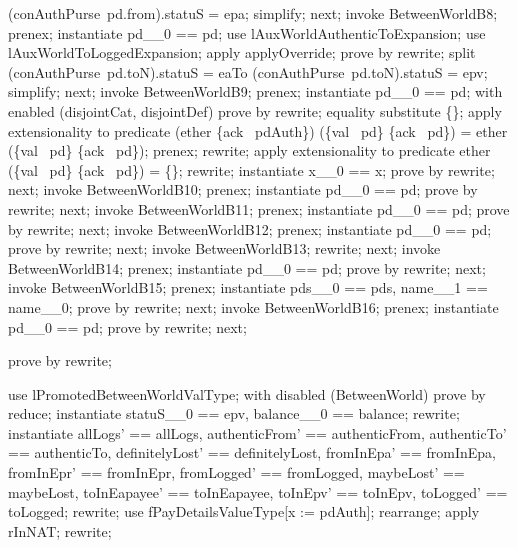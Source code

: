 \begin{LPScript}
\begin{zproof}[lPromotedBetweenWorldValType]
          \lor (conAuthPurse~pd.from).statuS = epa;
        simplify;
    next;
        invoke BetweenWorldB8;
        prenex;
        instantiate pd\_\_0 == pd;
        use lAuxWorldAuthenticToExpansion;
        use lAuxWorldToLoggedExpansion;
        apply applyOverride;
        prove by rewrite;
        split (conAuthPurse~pd.toN).statuS = eaTo
            \lor (conAuthPurse~pd.toN).statuS = epv;
        simplify;
    next;
        invoke BetweenWorldB9;
        prenex;
        instantiate pd\_\_0 == pd;
        with enabled (disjointCat, disjointDef) prove by rewrite;
        equality substitute \{\};
        apply extensionality to predicate
            (ether \cup \{ack~ pdAuth\}) \cap (\{val~ pd\} \cup \{ack~ pd\})
             = ether \cap (\{val~ pd\} \cup \{ack~ pd\});
        prenex;
        rewrite;
        apply extensionality to predicate
            ether \cap (\{val~ pd\} \cup \{ack~ pd\}) = \{\};
        rewrite;
        instantiate x\_\_0 == x;
        prove by rewrite;
    next;
        invoke BetweenWorldB10;
        prenex;
        instantiate pd\_\_0 == pd;
        prove by rewrite;
    next;
        invoke BetweenWorldB11;
        prenex;
        instantiate pd\_\_0 == pd;
        prove by rewrite;
    next;
        invoke BetweenWorldB12;
        prenex;
        instantiate pd\_\_0 == pd;
        prove by rewrite;
    next;
        invoke BetweenWorldB13;
        rewrite;
    next;
        invoke BetweenWorldB14;
        prenex;
        instantiate pd\_\_0 == pd;
        prove by rewrite;
    next;
        invoke BetweenWorldB15;
        prenex;
        instantiate pds\_\_0 == pds, name\_\_1 == name\_\_0;
        prove by rewrite;
    next;
        invoke BetweenWorldB16;
        prenex;
        instantiate pd\_\_0 == pd;
        prove by rewrite;
    next;
\end{zproof}\end{LPScript}

\begin{LDCheck}\begin{zproof}
    prove by rewrite;
\end{zproof}\end{LDCheck}

\begin{LPScript}\begin{zproof}[tBetwValOkayPRE]
    use lPromotedBetweenWorldValType;
    with disabled (BetweenWorld) prove by reduce;
    instantiate statuS\_\_0 == epv, balance\_\_0 == balance;
    rewrite;
    instantiate allLogs' == allLogs, authenticFrom' == authenticFrom,
        authenticTo' == authenticTo, definitelyLost' == definitelyLost,
        fromInEpa' == fromInEpa, fromInEpr' == fromInEpr,
        fromLogged' == fromLogged, maybeLost' == maybeLost,
        toInEapayee' == toInEapayee, toInEpv' == toInEpv,
        toLogged' == toLogged;
    rewrite;
    use fPayDetailsValueType[x := pdAuth];
    rearrange;
    apply rInNAT;
    rewrite;
\end{zproof}\end{LPScript}

